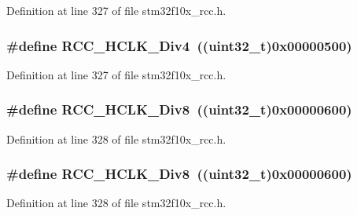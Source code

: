 Definition at line 327 of file stm32f10x\+\_\+rcc.\+h.

\subsubsection[{\texorpdfstring{R\+C\+C\+\_\+\+H\+C\+L\+K\+\_\+\+Div4}{RCC_HCLK_Div4}}]{\setlength{\rightskip}{0pt plus 5cm}\#define R\+C\+C\+\_\+\+H\+C\+L\+K\+\_\+\+Div4~(({\bf uint32\+\_\+t})0x00000500)}\hypertarget{group___a_p_b1___a_p_b2__clock__source_gafd8cf0e32a3ea5648cdc054766bc2017}{}\label{group___a_p_b1___a_p_b2__clock__source_gafd8cf0e32a3ea5648cdc054766bc2017}


Definition at line 327 of file stm32f10x\+\_\+rcc.\+h.

\subsubsection[{\texorpdfstring{R\+C\+C\+\_\+\+H\+C\+L\+K\+\_\+\+Div8}{RCC_HCLK_Div8}}]{\setlength{\rightskip}{0pt plus 5cm}\#define R\+C\+C\+\_\+\+H\+C\+L\+K\+\_\+\+Div8~(({\bf uint32\+\_\+t})0x00000600)}\hypertarget{group___a_p_b1___a_p_b2__clock__source_gab2e2b6e0b8fe22d6638b672918b22097}{}\label{group___a_p_b1___a_p_b2__clock__source_gab2e2b6e0b8fe22d6638b672918b22097}


Definition at line 328 of file stm32f10x\+\_\+rcc.\+h.

\subsubsection[{\texorpdfstring{R\+C\+C\+\_\+\+H\+C\+L\+K\+\_\+\+Div8}{RCC_HCLK_Div8}}]{\setlength{\rightskip}{0pt plus 5cm}\#define R\+C\+C\+\_\+\+H\+C\+L\+K\+\_\+\+Div8~(({\bf uint32\+\_\+t})0x00000600)}\hypertarget{group___a_p_b1___a_p_b2__clock__source_gab2e2b6e0b8fe22d6638b672918b22097}{}\label{group___a_p_b1___a_p_b2__clock__source_gab2e2b6e0b8fe22d6638b672918b22097}


Definition at line 328 of file stm32f10x\+\_\+rcc.\+h.

